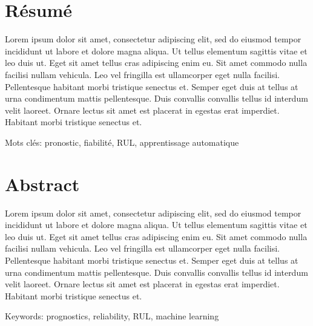 \chapter*{Résumé}
\vspace{-2cm}
Lorem ipsum dolor sit amet, consectetur adipiscing elit, sed do eiusmod tempor incididunt ut labore et dolore magna aliqua. Ut tellus elementum sagittis vitae et leo duis ut. Eget sit amet tellus cras adipiscing enim eu. Sit amet commodo nulla facilisi nullam vehicula. Leo vel fringilla est ullamcorper eget nulla facilisi. Pellentesque habitant morbi tristique senectus et. Semper eget duis at tellus at urna condimentum mattis pellentesque. Duis convallis convallis tellus id interdum velit laoreet. Ornare lectus sit amet est placerat in egestas erat imperdiet. Habitant morbi tristique senectus et. 


Mots clés: pronostic, fiabilité, RUL, apprentissage automatique

{\let\clearpage\relax\chapter*{Abstract}}
\vspace{-2cm}
Lorem ipsum dolor sit amet, consectetur adipiscing elit, sed do eiusmod tempor incididunt ut labore et dolore magna aliqua. Ut tellus elementum sagittis vitae et leo duis ut. Eget sit amet tellus cras adipiscing enim eu. Sit amet commodo nulla facilisi nullam vehicula. Leo vel fringilla est ullamcorper eget nulla facilisi. Pellentesque habitant morbi tristique senectus et. Semper eget duis at tellus at urna condimentum mattis pellentesque. Duis convallis convallis tellus id interdum velit laoreet. Ornare lectus sit amet est placerat in egestas erat imperdiet. Habitant morbi tristique senectus et. 


Keywords: prognostics, reliability, RUL, machine learning